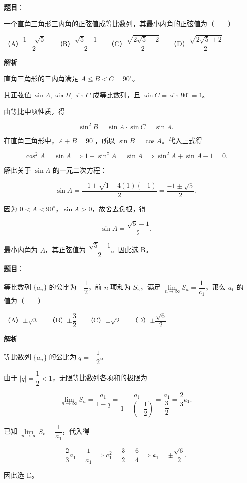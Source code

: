\begin{answer}

\textbf{题目}：

一个直角三角形三内角的正弦值成等比数列，其最小内角的正弦值为\mbox{（　　）}

（A）$\dfrac{1-\sqrt5}2$　　（B）$\dfrac{\sqrt5-1}2$　　（C）$\dfrac{\sqrt{2\sqrt5-2}}2$　　（D）$\dfrac{\sqrt{2\sqrt5+2}}2$

\textbf{解析}

直角三角形的三内角满足 $A \le B < C = 90^\circ$。

其正弦值 $\sin A, \sin B, \sin C$ 成等比数列，且 $\sin C = \sin 90^\circ = 1$。

由等比中项性质，得

\nopagebreak[4]
\[
\sin^2 B = \sin A \cdot \sin C = \sin A.
\]

在直角三角形中，$A+B=90^\circ$，所以 $\sin B = \cos A$。代入上式得

\nopagebreak[4]
\[
\cos^2 A = \sin A \implies 1 - \sin^2 A = \sin A \implies \sin^2 A + \sin A - 1 = 0.
\]

解此关于 $\sin A$ 的一元二次方程：

\nopagebreak[4]
\[
\sin A = \frac{-1 \pm \sqrt{1 - 4(1)(-1)}}{2} = \frac{-1 \pm \sqrt5}{2}.
\]

因为 $0 < A < 90^\circ$，$\sin A > 0$，故舍去负根，得

\nopagebreak[4]
\[
\sin A = \frac{\sqrt5 - 1}{2}.
\]

最小内角为 $A$，其正弦值为 $\dfrac{\sqrt5-1}{2}$。因此选 B。


\end{answer}
\begin{answer}

\textbf{题目}：

等比数列 $\{a_n\}$ 的公比为 $-\dfrac12$，前 $n$ 项和为 $S_n$，满足 $\lim\limits_{n\to\infty} S_n = \dfrac{1}{a_1}$，那么 $a_1$ 的值为\mbox{（　　）}

（A）$\pm\sqrt3$　　（B）$\pm\dfrac32$　　（C）$\pm\sqrt2$　　（D）$\pm\dfrac{\sqrt6}2$

\textbf{解析}

等比数列 $\{a_n\}$ 的公比为 $q = -\dfrac12$。

由于 $|q| = \dfrac12 < 1$，无限等比数列各项和的极限为

\nopagebreak[4]
\[
\lim_{n\to\infty} S_n = \frac{a_1}{1 - q} = \frac{a_1}{1 - \left(-\dfrac12\right)} = \frac{a_1}{\dfrac32} = \frac23 a_1.
\]

已知 $\lim\limits_{n\to\infty} S_n = \dfrac{1}{a_1}$，代入得

\nopagebreak[4]
\[
\frac23 a_1 = \frac{1}{a_1} \implies a_1^2 = \frac32 = \frac64 \implies a_1 = \pm\frac{\sqrt6}{2}.
\]

因此选 D。


\end{answer}
